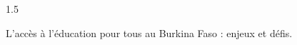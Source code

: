 \documentclass[12pt]{article}
\begin{document}
\begin{spacing}{1.5}

L'accès à l'éducation pour tous au Burkina Faso : enjeux et défis.


\quad
\quad

\end{spacing}
\end{document}
